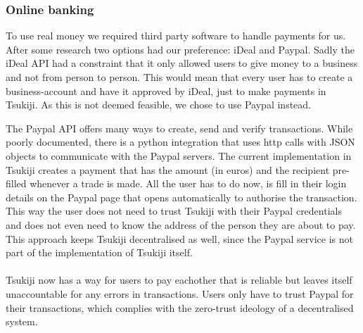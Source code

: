 \subsubsection{Online banking}
To use real money we required third party software to handle payments for us. 
After some research two options had our preference: iDeal and Paypal.
Sadly the iDeal API had a constraint that it only allowed users to give money to a business and not from person to person.
This would mean that every user has to create a business-account and have it approved by iDeal, just to make payments in Tsukiji.
As this is not deemed feasible, we chose to use Paypal instead.

The Paypal API offers many ways to create, send and verify transactions.
While poorly documented, there is a python integration that uses http calls with JSON objects to communicate with the Paypal servers.
The current implementation in Tsukiji creates a payment that has the amount (in euros) and the recipient pre-filled whenever a trade is made.
All the user has to do now, is fill in their login details on the Paypal page that opens automatically to authorise the transaction.
This way the user does not need to trust Tsukiji with their Paypal credentials and does not even need to know the address of the person they are about to pay.
This approach keeps Tsukiji decentralised as well, since the Paypal service is not part of the implementation of Tsukiji itself.\\
\\
Tsukiji now has a way for users to pay eachother that is reliable but leaves itself unaccountable for any errors in transactions.
Users only have to trust Paypal for their transactions, which complies with the zero-trust ideology of a decentralised system.
